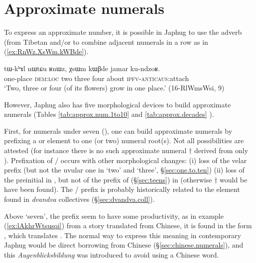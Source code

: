 \section{Approximate numerals} \label{sec:approx.numerals}
To express an approximate number, it is possible in Japhug to use the adverb  (from Tibetan  and/or to combine adjacent numerals in a row as in (\ref{ex:RnWz.XsWm.kWBde}).

\begin{exe}
\ex \label{ex:RnWz.XsWm.kWBde}
\gll tɯ-kʰɤl nɯtɕu ʁnɯz, χsɯm kɯβde jamar ku-ndzoʁ. \\
one-place \textsc{dem}:\textsc{loc} two three four about \textsc{ipfv}-\textsc{anticaus}:attach \\
\glt `Two, three or four (of its flowers) grow in one place.' (16-RlWmsWsi, 9)
\end{exe}

However, Japhug also has five morphological devices to build approximate numerals (Tables \ref{tab:approx.num.1to10} and \ref{tab:approx.decades} ).

First, for numerals under seven (), one can build approximate numerals by prefixing a  or  element to one (or two) numeral root(s). Not all possibilities are attested (for instance there is no such approximate numeral $\dagger$ derived from only ).  Prefixation of  /  occurs with other morphological changes: (i) loss of the velar  prefix (but not the uvular one in `two' and `three', §\ref{sec:one.to.ten}) (ii) loss of the  preinitial in  , but not of the  prefix of  (§\ref{sec:teens}) in  (otherwise $\dagger$ would be have been found). The  /  prefix is probably historically related to the  element found in \textit{dvandva} collectives (§\ref{sec:dvandva.coll}).  


Above `seven', the  prefix seem to have some productivity, as in example (\ref{ex:lAkhrWtsusqi}) from a story translated from Chinese, it is found in the form , which translates . The normal way to express this meaning in contemporary Japhug would be direct borrowing from Chinese (§\ref{sec:chinese.numerals}), and this \textit{Augenblicksbildung} was introduced to avoid using a Chinese word.

